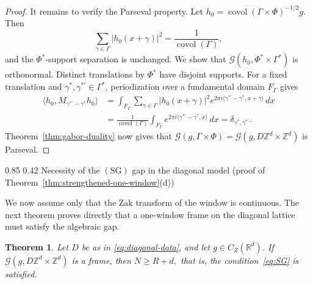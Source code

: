 \documentclass[11pt,reqno]{amsart}
\makeatletter
\numberwithin{equation}{section}
\renewcommand\subsection{\@startsection{subsection}{2}{\z@}%
  {0.85\baselineskip \@plus 0.25\baselineskip \@minus 0.10\baselineskip}%
  {0.42\baselineskip}%
  {\normalfont\bfseries}}
\newtheorem{theorem}{Theorem}[section]
\theoremstyle{definition}
\theoremstyle{remark}
\newcommand{\R}{\mathbb R}
\newcommand{\Z}{\mathbb Z}
\newcommand{\covol}{\operatorname{covol}}
\newcommand{\G}{\mathcal G}
\newcommand{\ip}[2]{\langle #1,#2\rangle}
\newcommand{\SG}{\ensuremath{(\mathrm{SG})}\xspace}
\newcommand{\CZ}{C_Z}
\makeatother
\begin{document}
\begin{proof}
It remains to verify the Parseval property.  Let
$
                         h_0=\covol(\Gamma\times\Phi)^{-1/2}g.
$
Then
\[
 \sum_{\gamma\in\Gamma}|h_0(x+\gamma)|^2
 =\frac1{\covol(\Gamma)},
\]
and the $\Phi^*$-support separation is unchanged.  We show that
$\G(h_0,\Phi^*\times\Gamma^*)$ is orthonormal.  Distinct translations by
$\Phi^*$ have disjoint supports.  For a fixed translation and
$\gamma^*,\gamma^{*\prime}\in\Gamma^*$, periodization over a fundamental
domain $F_\Gamma$ gives
\[
 \begin{aligned}
 \ip{h_0}{M_{\gamma^{*\prime}-\gamma^*}h_0}
 &=\int_{F_\Gamma}\sum_{\gamma\in\Gamma}|h_0(x+\gamma)|^2
   e^{2\pi i\ip{\gamma^{*\prime}-\gamma^*}{x+\gamma}}\,dx\\
 &=\frac1{\covol(\Gamma)}
   \int_{F_\Gamma}
   e^{2\pi i\ip{\gamma^{*\prime}-\gamma^*}{x}}\,dx
 =\delta_{\gamma^*,\gamma^{*\prime}}.
 \end{aligned}
\]
Theorem~\ref{thm:gabor-duality} now gives that
$\G(g,\Gamma\times\Phi)=\G(g,D\Z^d\times\Z^d)$ is Parseval.
\end{proof}

\subsection{Necessity of the $\SG$ gap in the diagonal model (proof of Theorem~\ref{thm:strengthened-one-window}\textup{(d)})}
\label{sec:rational-zak}

We now assume only that the Zak transform of the window is continuous.  The
next theorem proves directly that a one-window frame on the diagonal lattice
must satisfy the algebraic gap.

\begin{theorem}
\label{thm:diagonal-one-window}
Let $D$ be as in \eqref{eq:diagonal-data}, and let $g\in\CZ(\R^d)$.  If
\(
                         \G(g,D\Z^d\times\Z^d)
\)
is a frame, then
\(
                              N\ge R+d,
\)
that is, the condition~\eqref{eq:SG} is satisfied.
\end{theorem}
\end{document}
